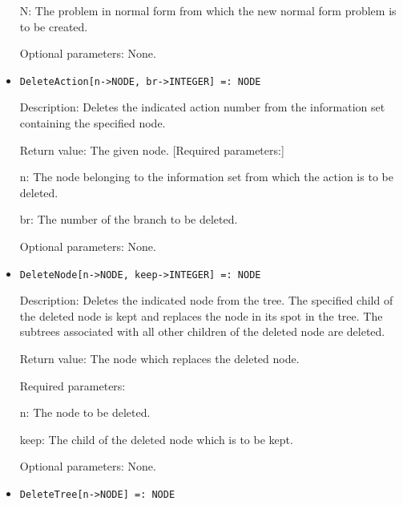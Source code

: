 \begin{itemize}
\bd
\item
[N:] The problem in normal form from which the new normal form problem
is to be created.
\ed

\item  
[Optional parameters:] None.
\ed

\item
\protect \large \begin{verbatim}
DeleteAction[n->NODE, br->INTEGER] =: NODE
\end{verbatim}\normalsize

\bd
\item
[Description:] Deletes the indicated action number from the
information set containing the specified node.
\item
[Return value:] The given node.  [Required parameters:]\hfil\null
	
\bd
\item
[n:] The node belonging to the information set from which the action
is to be deleted.
\item [br:] The number of the branch to be deleted.
\ed

\item
[Optional parameters:] None.
\ed

\item
\protect \large \begin{verbatim}
DeleteNode[n->NODE, keep->INTEGER] =: NODE
\end{verbatim}\normalsize

\bd
\item   
[Description:] Deletes the indicated node from the tree.  The
specified child of the deleted node is kept and replaces the node in
its spot in the tree.  The subtrees associated with all other children
of the deleted node are deleted.
\item
[Return value:] The node which replaces the deleted node.
\item
[Required parameters:]\hfil\null
	
\bd
\item
[n:] The node to be deleted.
\item
[keep:] The child of the deleted node which is to be kept.
\ed

\item
[Optional parameters:] None.
\ed

\item
\protect \large \begin{verbatim}
DeleteTree[n->NODE] =: NODE
\end{verbatim}\normalsize


\end{itemize}
